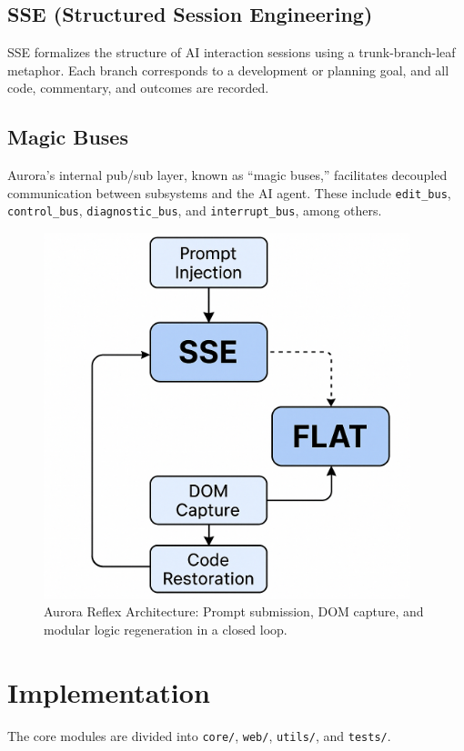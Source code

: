 \documentclass{article}
\begin{document}
\subsection{SSE (Structured Session Engineering)}
SSE formalizes the structure of AI interaction sessions using a trunk-branch-leaf metaphor. Each branch corresponds to a development or planning goal, and all code, commentary, and outcomes are recorded.

\subsection{Magic Buses}
Aurora’s internal pub/sub layer, known as “magic buses,” facilitates decoupled communication between subsystems and the AI agent. These include \texttt{edit\_bus}, \texttt{control\_bus}, \texttt{diagnostic\_bus}, and \texttt{interrupt\_bus}, among others.

\begin{figure}[h!]
\centering
\includegraphics[width=0.95\textwidth]{graphics/aurora_reflex_flow.png}
\caption{Aurora Reflex Architecture: Prompt submission, DOM capture, and modular logic regeneration in a closed loop.}
\label{fig:aurora-flow}
\end{figure}

\section{Implementation}
The core modules are divided into \texttt{core/}, \texttt{web/}, \texttt{utils/}, and \texttt{tests/}. 
\end{document}
